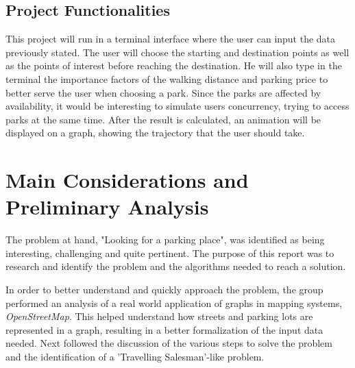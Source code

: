 \documentclass[a4paper, 12pt]{report}
\begin{document}
    \section{Project Functionalities}
    
    This project will run in a terminal interface where the user can input the data previously stated. The user will choose the starting and destination points as well as the points of interest before reaching the destination. He will also type in the terminal the importance factors of the walking distance and parking price to better serve the user when choosing a park. Since the parks are affected by availability, it would be interesting to simulate users concurrency, trying to access parks at the same time. After the result is calculated, an animation will be displayed on a graph, showing the trajectory that the user should take.
    
    \pagebreak
     
    \chapter{Main Considerations and Preliminary Analysis} %
    
    The problem at hand, "Looking for a parking place", was identified as being interesting, challenging and quite pertinent. The purpose of this report was to research and identify the problem and the algorithms needed to reach a solution.
    
    In order to better understand and quickly approach the problem, the group performed an analysis of a real world application of graphs in mapping systems, \textit{OpenStreetMap}. This helped understand how streets and parking lots are represented in a graph, resulting in a better formalization of the input data needed. Next followed the discussion of the various steps to solve the problem and the identification of a 'Travelling Salesman'-like problem.
    
\end{document}
